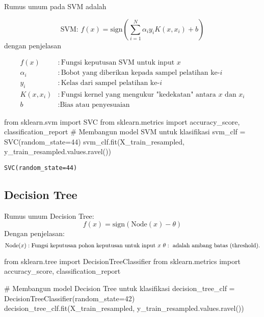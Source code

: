 \documentclass[
  letterpaper,
]{krantz}
\makeatletter
\newenvironment{Shaded}{\begin{snugshade}}{\end{snugshade}}
\newcommand{\CommentTok}[1]{\textcolor[rgb]{0.37,0.37,0.37}{#1}}
\newcommand{\DecValTok}[1]{\textcolor[rgb]{0.68,0.00,0.00}{#1}}
\newcommand{\ImportTok}[1]{\textcolor[rgb]{0.00,0.46,0.62}{#1}}
\newcommand{\NormalTok}[1]{\textcolor[rgb]{0.00,0.23,0.31}{#1}}
\newcommand{\OperatorTok}[1]{\textcolor[rgb]{0.37,0.37,0.37}{#1}}
\newenvironment{kframe}{%
\medskip{}
\setlength{\fboxsep}{.8em}
 \def\at@end@of@kframe{}%
 \ifinner\ifhmode%
  \def\at@end@of@kframe{\end{minipage}}%
  \begin{minipage}{\columnwidth}%
 \fi\fi%
 \def\FrameCommand##1{\hskip\@totalleftmargin \hskip-\fboxsep
 \colorbox{shadecolor}{##1}\hskip-\fboxsep
     \hskip-\linewidth \hskip-\@totalleftmargin \hskip\columnwidth}%
 \MakeFramed {\advance\hsize-\width
   \@totalleftmargin\z@ \linewidth\hsize
   \@setminipage}}%
 {\par\unskip\endMakeFramed%
 \at@end@of@kframe}
\renewenvironment{Shaded}{\begin{kframe}}{\end{kframe}}
\makeatother
\begin{document}
Rumus umum pada SVM adalah

\[\text{SVM: } f(x) = \text{sign}\left(\sum_{i=1}^{N} \alpha_i y_i K(x, x_i) + b\right)\]
dengan penjelasan

\begin{align*}
f(x) & : \text{Fungsi keputusan SVM untuk input } x \\
\alpha_i & : \text{Bobot yang diberikan kepada sampel pelatihan ke-} i \\
y_i & : \text{Kelas dari sampel pelatihan ke-} i \\
K(x, x_i) & : \text{Fungsi kernel yang mengukur "kedekatan" antara } x \text{ dan } x_i \\
b & : \text{Bias atau penyesuaian}
\end{align*}

\begin{Shaded}
\begin{Highlighting}[]
\ImportTok{from}\NormalTok{ sklearn.svm }\ImportTok{import}\NormalTok{ SVC}
\ImportTok{from}\NormalTok{ sklearn.metrics }\ImportTok{import}\NormalTok{ accuracy\_score, classification\_report}
\CommentTok{\# Membangun model SVM untuk klasifikasi}
\NormalTok{svm\_clf }\OperatorTok{=}\NormalTok{ SVC(random\_state}\OperatorTok{=}\DecValTok{44}\NormalTok{)}
\NormalTok{svm\_clf.fit(X\_train\_resampled, y\_train\_resampled.values.ravel())}
\end{Highlighting}
\end{Shaded}

\begin{verbatim}
SVC(random_state=44)
\end{verbatim}

\hypertarget{decision-tree}{%
\subsection{Decision Tree}\label{decision-tree}}

Rumus umum Decision Tree: \[
f(x) = \text{sign}\left(\text{Node}(x) - \theta\right)
\] Dengan penjelasan: \[
\text{Node}(x):\text{Fungsi keputusan pohon keputusan untuk input } x
\\\ \theta: \text{ adalah ambang batas (threshold).}
\]

\begin{Shaded}
\begin{Highlighting}[]
\ImportTok{from}\NormalTok{ sklearn.tree }\ImportTok{import}\NormalTok{ DecisionTreeClassifier}
\ImportTok{from}\NormalTok{ sklearn.metrics }\ImportTok{import}\NormalTok{ accuracy\_score, classification\_report}

\CommentTok{\# Membangun model Decision Tree untuk klasifikasi}
\NormalTok{decision\_tree\_clf }\OperatorTok{=}\NormalTok{ DecisionTreeClassifier(random\_state}\OperatorTok{=}\DecValTok{42}\NormalTok{)}
\NormalTok{decision\_tree\_clf.fit(X\_train\_resampled, y\_train\_resampled.values.ravel())}
\end{Highlighting}
\end{Shaded}
\end{document}
